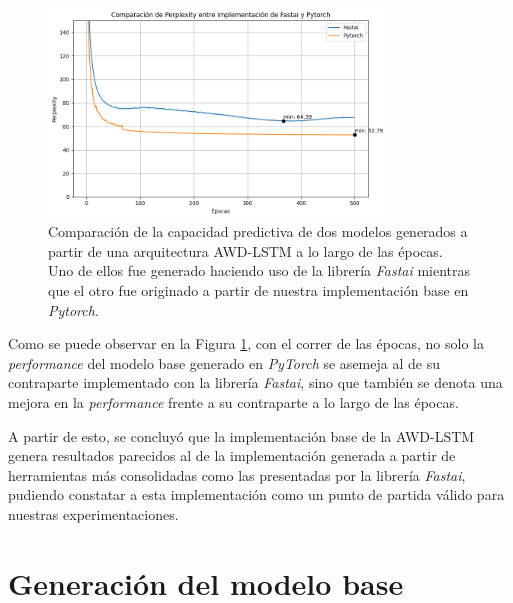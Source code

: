 
\begin{figure}[htb]
    \centering
    \includegraphics[width=0.8\textwidth]{imagenes/validacion_modelo.png}
    \caption{Comparación de la capacidad predictiva de dos modelos generados a partir 
    de una arquitectura AWD-LSTM a lo largo de las épocas. Uno de ellos fue generado 
    haciendo uso de la librería \textit{Fastai} mientras que el otro fue originado a partir 
    de nuestra implementación base en \textit{Pytorch}.}
    \label{fig:validacion_modelo}
\end{figure}

Como se puede observar en la Figura \ref{fig:validacion_modelo}, con el correr de las épocas, no solo la 
\textit{performance} del modelo base generado en \textit{PyTorch} se asemeja al de su contraparte 
implementado con la librería \textit{Fastai}, sino que también se denota una mejora en la 
\textit{performance} frente a su contraparte a lo largo de las épocas.


A partir de esto, se concluyó que la implementación base de la AWD-LSTM genera resultados 
parecidos al de la implementación generada a partir de herramientas más consolidadas 
como las presentadas por la librería \textit{Fastai}, pudiendo constatar a esta implementación 
como un punto de partida válido para nuestras experimentaciones.

\section{Generación del modelo base}


